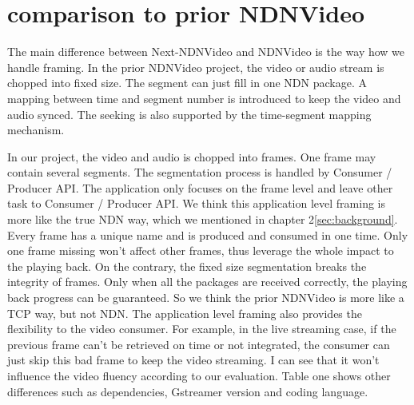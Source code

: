 \section{comparison to prior NDNVideo} %
\label{sec:comparison}
The main difference between Next-NDNVideo and NDNVideo is the way how we handle framing. In the prior NDNVideo project, the video or audio stream is chopped into fixed size. The segment can just fill in one NDN package. A mapping between time and segment number is introduced to keep the video and audio synced. The seeking is also supported by the time-segment mapping mechanism. 

In our project, the video and audio is chopped into frames. One frame may contain several segments. The segmentation process is handled by Consumer / Producer API. The application only focuses on the frame level and leave other task to Consumer / Producer API. We think this application level framing is more like the true NDN way, which we mentioned in chapter 2\ref{sec:background}. Every frame has a unique name and is produced and consumed in one time. Only one frame missing won't affect other frames, thus leverage the whole impact to the playing back. On the contrary, the fixed size segmentation breaks the integrity of frames. Only when all the packages are received correctly, the playing back progress can be guaranteed.  So we think the prior NDNVideo is more like a TCP way, but not NDN.  The application level framing also provides the flexibility to the video consumer. For example, in the live streaming case, if the previous frame can't be retrieved on time or not integrated, the consumer can just skip this bad frame to keep the video streaming. I can see that it won't influence the video fluency according to our evaluation. Table one shows other differences such as dependencies, Gstreamer version and coding language.

